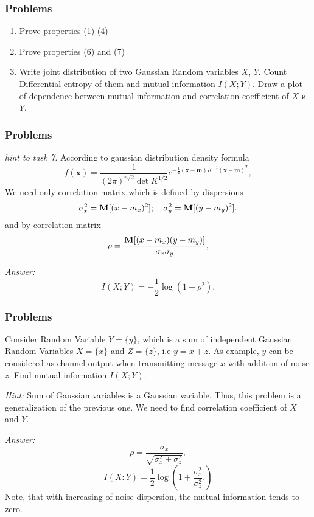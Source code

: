 \documentclass[14pt]{beamer}
\renewcommand{\vec}[1]{\ensuremath{\boldsymbol{#1}}}
\begin{document}
\begin{frame}
\frametitle{Problems}
\begin{enumerate}
    

    \item[5] Prove properties (1)-(4) %

    \pause
    \item[6] Prove properties (6) and (7) %

    \pause
    \item[7] \label{IG2} Write joint distribution of two Gaussian Random variables $X$, $Y$. Count Differential entropy of them and mutual information $I(X;Y)$. Draw a plot of dependence between mutual information and correlation coefficient of $X$ и $Y$.


\end{enumerate}
\end{frame}


\begin{frame}
\frametitle{Problems}
\begin{itemize}
\small{ 

    \item \emph{hint to task 7.} According to gaussian distribution density formula
    \begin{equation}
    \label{gauss}%
    f(\vec x)=\frac{1}{(2\pi)^{n/2}\det K^{1/2}}e^{-\frac{1}{2}(\vec x
    -\vec m)K^{-1}(\vec x -\vec m)^T},
    \end{equation}
    We need only correlation matrix which is defined by dispersions
    \[
    \sigma_x^2={\rm \bf M} [(x-m_x)^2];\quad %
    \sigma_y^2={\rm \bf M} [(y-m_y)^2].
    \]
    and by correlation matrix
    \[
    \rho=\frac{{\rm \bf M} [ (x-m_x)(y-m_y)]}{\sigma_x \sigma_y},
    \]

    \emph{Answer:}
    \[ I(X;Y)=- \frac {1}{2} \log(1-\rho^2).\]
}
\end{itemize}
\end{frame}


\begin{frame}
\frametitle{Problems}
\begin{enumerate}
\small{ 
    \item[8] \label{IG3} Consider Random Variable $Y=\{y\}$, which is a sum of independent Gaussian Random Variables $X=\{x\}$ and $Z=\{z\}$, i.e $y=x+z$. 
    As example, $y$ can be considered as channel output when transmitting message $x$ with addition of noise $z$. Find mutual information $I(X;Y)$.


    \pause \emph{Hint:} Sum of Gaussian variables is a Gaussian variable. Thus, this problem is a generalization of the previous one. We need to find correlation coefficient of $X$ and $Y$.
}
\footnotesize {    
    \emph{Answer:}
    \[
    \rho=\frac {\sigma_x}{\sqrt{\sigma_x^2+\sigma_z^2}},
    \]
    \[
    I(X:Y)=\frac {1}{2} \log\left(1+ \frac{\sigma_x^2}{\sigma_z^2}.
    \right)
    \]
    Note, that with increasing of noise dispersion, the mutual information tends to zero.
}
\end{enumerate}
\end{frame}
\end{document}
